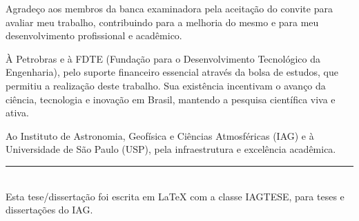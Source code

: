 




Agradeço aos membros da banca examinadora pela aceitação do convite para avaliar meu trabalho, contribuindo para a melhoria do mesmo e para meu desenvolvimento profissional e acadêmico.

À Petrobras e à FDTE (Fundação para o Desenvolvimento Tecnológico da Engenharia), pelo suporte financeiro essencial através da bolsa de estudos, que permitiu a realização deste trabalho. Sua existência incentivam o avanço da ciência, tecnologia e inovação em Brasil, mantendo a pesquisa científica viva e ativa.

Ao Instituto de Astronomia, Geofísica e Ciências Atmosféricas (IAG) e à Universidade de São Paulo (USP), pela infraestrutura e excelência acadêmica.

\vfill

\begin{flushleft}
\rule{6cm}{0.5pt}\\
{\footnotesize{Esta tese/dissertação foi escrita em \LaTeX{} com a classe IAGTESE, para teses e dissertações do IAG.}}
\end{flushleft}